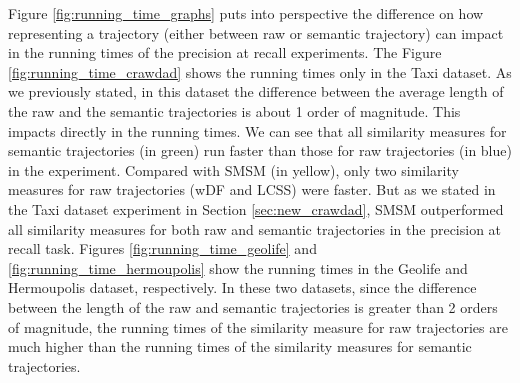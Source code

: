 Figure \ref{fig:running_time_graphs} puts into perspective the difference on how representing a trajectory (either between raw or semantic trajectory) can impact in the running times of the precision at recall experiments. The Figure \ref{fig:running_time_crawdad} shows the running times only in the Taxi dataset. As we previously stated, in this dataset the difference between the average length of the raw and the semantic trajectories is about 1 order of magnitude. This impacts directly in the running times. We can see that all similarity measures for semantic trajectories (in green) run faster than those for raw trajectories (in blue) in the experiment. Compared with SMSM (in yellow), only two similarity measures for raw trajectories (wDF and LCSS) were faster. But as we stated in the Taxi dataset experiment in Section \ref{sec:new_crawdad}, SMSM outperformed all similarity measures for both raw and semantic trajectories in the precision at recall task.
Figures \ref{fig:running_time_geolife} and \ref{fig:running_time_hermoupolis} show the running times in the Geolife and Hermoupolis dataset, respectively. In these two datasets, since the difference between the length of the raw and semantic trajectories is greater than 2 orders of magnitude, the running times of the similarity measure for raw trajectories are much higher than the running times of the similarity measures for semantic trajectories.

